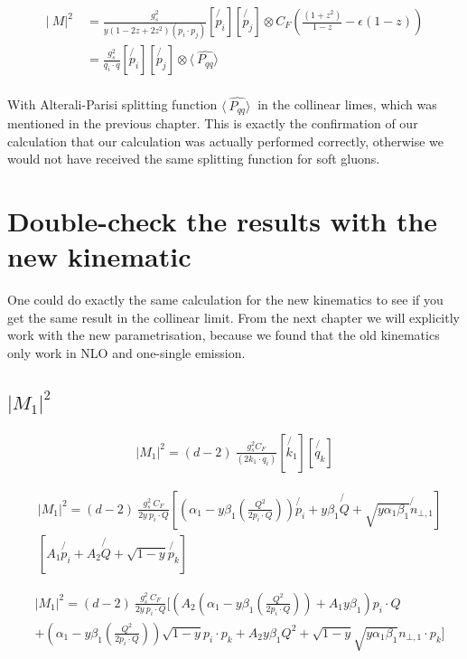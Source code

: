 \begin{equation}
\begin{split}
\lvert\:M\lvert^2\: &=\frac{g_s^2}{y(1-2z+2z^2)(p_i \cdot p_j)}[\not{p_i}][\not{p_j}]\otimes C_F(\frac{(1+z^2)}{1-z}-\epsilon(1-z))\\
&=\frac{g_s^2}{q_i \cdot q}[\not{p_i}][\not{p_j}]\otimes \langle\:\hat{P_{qq}}\rangle\:\\
\end{split}
\end{equation}

With Alterali-Parisi splitting function $ \langle\:\hat{P_{qq}}\rangle\: $ in the collinear limes, which was mentioned in the previous chapter. This is exactly the confirmation of our calculation that our calculation was actually performed correctly, otherwise we would not have received the same splitting function for soft gluons.
\newpage

\section{Double-check the results with the new kinematic}
One could do exactly the same calculation for the new kinematics to see if you get the same result in the collinear limit. From the next chapter we will explicitly work with the new parametrisation, because we found that the old kinematics only work in NLO and one-single emission. 
\subsection*{$ |M_1|^2 $}

\begin{equation}
\begin{split}
|M_1|^2=(d-2)\:\frac{g_s^2  C_F }{(2k_1\cdot q_i)}
[\not{k_1} ][\not{q_k}]
\end{split}
\end{equation}

\begin{equation}
\begin{split}
&|M_1|^2=(d-2)\:\frac{g_s^2 \: C_F }{2y\: p_i \cdot Q}
[(\alpha_1 -y\beta_1(\frac{Q^2}{2p_i \cdot Q})) \not{p_i} + y\beta_1\not{Q} + \sqrt{y\alpha_1\beta_1}\not{n}_{\bot,1} ]\\
&[A_1\not{p_i} + A_2\not{Q} + \sqrt{1-y}\not{p_k}]
\end{split}
\end{equation}

\begin{equation}
\begin{split}
&|M_1|^2=(d-2)\:\frac{g_s^2 \: C_F }{2y\: p_i \cdot Q}
[(A_2(\alpha_1 -y\beta_1(\frac{Q^2}{2p_i \cdot Q}))+ A_1y\beta_1) {p_i}\cdot Q\\
&+(\alpha_1 -y\beta_1(\frac{Q^2}{2p_i \cdot Q}))\sqrt{1-y}p_i\cdot p_k+A_2 y\beta_1 Q^2+ \sqrt{1-y}\sqrt{y\alpha_1\beta_1}{n}_{\bot,1}\cdot p_k ]\\
\end{split}
\end{equation}

